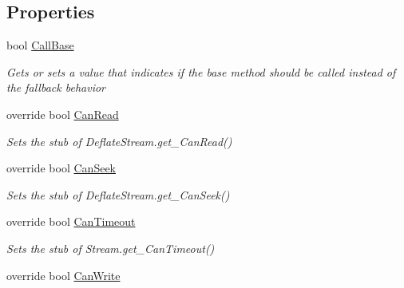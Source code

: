 \subsection*{Properties}
\begin{DoxyCompactItemize}
\item 
bool \hyperlink{class_system_1_1_i_o_1_1_compression_1_1_fakes_1_1_stub_deflate_stream_ab8cc4859e561b93e7a2a725f4bd66678}{Call\-Base}
\begin{DoxyCompactList}\small\item\em Gets or sets a value that indicates if the base method should be called instead of the fallback behavior\end{DoxyCompactList}\item 
override bool \hyperlink{class_system_1_1_i_o_1_1_compression_1_1_fakes_1_1_stub_deflate_stream_abba1d1c7de0da92f97045c2f68e6fa2e}{Can\-Read}
\begin{DoxyCompactList}\small\item\em Sets the stub of Deflate\-Stream.\-get\-\_\-\-Can\-Read()\end{DoxyCompactList}\item 
override bool \hyperlink{class_system_1_1_i_o_1_1_compression_1_1_fakes_1_1_stub_deflate_stream_a012b397ee46449c5a4764f80d6944948}{Can\-Seek}
\begin{DoxyCompactList}\small\item\em Sets the stub of Deflate\-Stream.\-get\-\_\-\-Can\-Seek()\end{DoxyCompactList}\item 
override bool \hyperlink{class_system_1_1_i_o_1_1_compression_1_1_fakes_1_1_stub_deflate_stream_a714c60bd7d61f2956514ae85857eff5e}{Can\-Timeout}
\begin{DoxyCompactList}\small\item\em Sets the stub of Stream.\-get\-\_\-\-Can\-Timeout()\end{DoxyCompactList}\item 
override bool \hyperlink{class_system_1_1_i_o_1_1_compression_1_1_fakes_1_1_stub_deflate_stream_a561a7b6d822f7061750073f2191241ba}{Can\-Write}

\end{DoxyCompactItemize}
